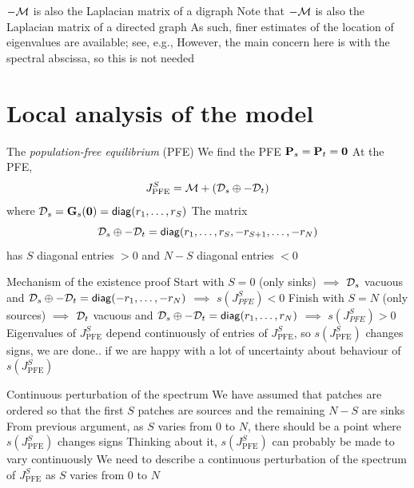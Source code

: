 \documentclass[aspectratio=169]{beamer}
\begin{document}
\begin{frame}{$-\mathcal{M}$ is also the Laplacian matrix of a digraph}
Note that $-\mathcal{M}$ is also the Laplacian matrix of a directed graph
\vfill 
As such, finer estimates of the location of eigenvalues are available; see, e.g.,  \cite{AgaevChebotarev2005}
\vfill
However, the main concern here is with the spectral abscissa, so this is not needed
\end{frame}


\section{Local analysis of the model}
\begin{frame}{The \emph{population-free equilibrium} (PFE)}
	We find the PFE
	$\bP_s=\bP_t=\b0$ 
	\vfill
	At the PFE,
	\begin{equation}\label{eq:J_PFE}
	J_{\textrm{PFE}}^S = \mathcal{M}+(\mathcal{D}_s\oplus -\mathcal{D}_t)
	\end{equation}
	where $\D_s=\bG_s(\b0)=\diag(r_1,\ldots,r_S)$
	\vfill
	The matrix
	\[
	\mathcal{D}_s\oplus -\mathcal{D}_t=\mathsf{diag} (r_1,\ldots,r_S,-r_{S+1},\ldots,-r_N)
	\]
	has $S$ diagonal entries $>0$ and $N-S$ diagonal entries $<0$
\end{frame}


\begin{frame}{Mechanism of the existence proof}
	Start with $S=0$ (only sinks)
	\newline
	$\implies$ $\mathcal{D}_s$ vacuous and $\mathcal{D}_s\oplus -\mathcal{D}_t = \mathsf{diag}(-r_1,\ldots,-r_N)$ \newline
	$\implies$ $s(J_{PFE}^S)<0$
	\vfill
	Finish with $S=N$ (only sources)
	\newline
	$\implies$ $\mathcal{D}_t$ vacuous and $\mathcal{D}_s\oplus -\mathcal{D}_t = \mathsf{diag}(r_1,\ldots,r_N)$ \newline
	$\implies$ $s(J_{PFE}^S)>0$
	\vfill
	Eigenvalues of $J_{\textrm{PFE}}^S$ depend continuously of entries of $J_{\textrm{PFE}}^S$, so $s(J_{\textrm{PFE}}^S)$ changes signs, we are done.. if we are happy with a lot of uncertainty about behaviour of $s(J_{\textrm{PFE}}^S)$
\end{frame}


\begin{frame}{Continuous perturbation of the spectrum}
	We have assumed that patches are ordered so that the first $S$ patches are sources and the remaining $N-S$ are sinks
	\vfill
	From previous argument, as $S$ varies from $0$ to $N$, there should be a point where $s(J_{\textrm{PFE}}^S)$ changes signs
	\vfill
	Thinking about it, $s(J_{\textrm{PFE}}^S)$ can probably be made to vary continuously
	\vfill
	We need to describe a continuous perturbation of the spectrum of $J_{\textrm{PFE}}^S$ as $S$ varies from $0$ to $N$
	\vfill

\end{frame}
\end{document}
